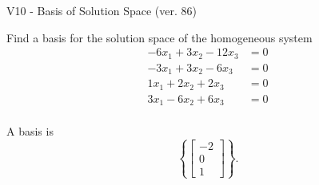 \begin{exercise}
  \begin{exerciseTitle}V10 - Basis of Solution Space (ver. 86)\end{exerciseTitle}
  \begin{exerciseStatement}
    Find a basis for the solution space of the homogeneous system 
\begin{align*}
 -6 x_ 1 + 3 x_ 2 -12 x_ 3 &= 0  \\ 
  -3 x_ 1 + 3 x_ 2 -6 x_ 3 &= 0  \\ 
  1 x_ 1 + 2 x_ 2 + 2 x_ 3 &= 0  \\ 
  3 x_ 1 -6 x_ 2 + 6 x_ 3 &= 0  \\ 
 \end{align*}


 
  \end{exerciseStatement}

  \begin{exerciseAnswer}
   A basis is   
\[\left\{\left[\begin{array}{c}
-2 \\
0 \\
1
\end{array}\right]\right\}.\]

  


  \end{exerciseAnswer}
\end{exercise}